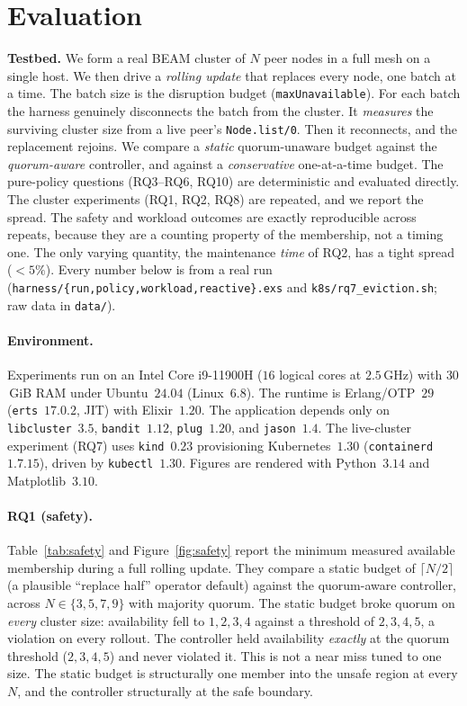 \documentclass[AMA,Times1COL]{WileyNJDv5}
\begin{document}
\section{Evaluation}\label{sec:eval}
\textbf{Testbed.} We form a real BEAM cluster of $N$ peer nodes in a full mesh on a single host. We then
drive a \emph{rolling update} that replaces every node, one batch at a time. The batch size is the
disruption budget (\texttt{maxUnavailable}). For each batch the harness genuinely disconnects the batch
from the cluster. It \emph{measures} the surviving cluster size from a live peer's \texttt{Node.list/0}.
Then it reconnects, and the replacement rejoins. We compare a \emph{static} quorum-unaware budget against
the \emph{quorum-aware} controller, and against a \emph{conservative} one-at-a-time budget. The
pure-policy questions (RQ3--RQ6, RQ10) are deterministic and evaluated directly. The cluster experiments
(RQ1, RQ2, RQ8) are repeated, and we report the spread. The safety and workload outcomes are exactly
reproducible across repeats, because they are a counting property of the membership, not a timing one.
The only varying quantity, the maintenance \emph{time} of RQ2, has a tight spread ($<5\%$). Every number
below is from a real run (\texttt{harness/\{run,policy,workload,reactive\}.exs} and
\texttt{k8s/rq7\_eviction.sh}; raw data in \texttt{data/}).

\paragraph{Environment.} Experiments run on an Intel Core i9-11900H ($16$ logical cores at $2.5$\,GHz)
with $30$\,GiB RAM under Ubuntu~$24.04$ (Linux~$6.8$). The runtime is Erlang/OTP~$29$
(\texttt{erts}~$17.0.2$, JIT) with Elixir~$1.20$. The application depends only on
\texttt{libcluster}~$3.5$, \texttt{bandit}~$1.12$, \texttt{plug}~$1.20$, and \texttt{jason}~$1.4$. The
live-cluster experiment (RQ7) uses \texttt{kind}~$0.23$ provisioning Kubernetes~$1.30$
(\texttt{containerd}~$1.7.15$), driven by \texttt{kubectl}~$1.30$. Figures are rendered with
Python~$3.14$ and Matplotlib~$3.10$.

\paragraph{RQ1 (safety).} Table~\ref{tab:safety} and Figure~\ref{fig:safety} report the minimum measured
available membership during a full rolling update. They compare a static budget of $\lceil N/2\rceil$ (a
plausible ``replace half'' operator default) against the quorum-aware controller, across
$N\in\{3,5,7,9\}$ with majority quorum. The static budget broke quorum on \emph{every} cluster size:
availability fell to $1,2,3,4$ against a threshold of $2,3,4,5$, a violation on every rollout. The
controller held availability \emph{exactly} at the quorum threshold ($2,3,4,5$) and never violated it.
This is not a near miss tuned to one size. The static budget is structurally one member into the unsafe
region at every $N$, and the controller structurally at the safe boundary.
\end{document}
